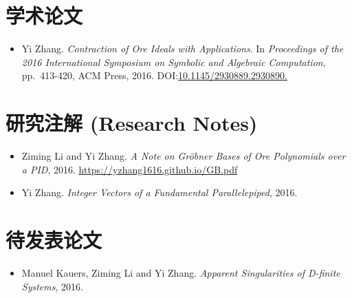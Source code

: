 \documentclass[a4paper,12pt]{article}
\begin{document}
\begin{CJK*}{UTF8}{gbsn}
\section*{\Large{学术论文}}
\begin{itemize}
 \item Yi Zhang. {\em Contraction of Ore Ideals with Applications}. 
       In {\em Proceedings of the 2016 International Symposium on Symbolic and Algebraic Computation}, 
       pp.\ 413-420, ACM Press, 2016. DOI:\href{http://dl.acm.org/citation.cfm?id=2930890}{10.1145/2930889.2930890.}
\end{itemize}

\section*{\Large{研究注解 (Research Notes)}}
\begin{itemize}
 \item Ziming Li and Yi Zhang. {\em A Note on Gr\"{o}bner Bases of Ore Polynomials over a PID}, 2016. 
 \url{https://yzhang1616.github.io/GB.pdf} 
 \item Yi Zhang. {\em Integer Vectors of a Fundamental Parallelepiped}, 2016.
\end{itemize}

\section*{\Large{待发表论文}}
\begin{itemize}
 \item Manuel Kauers, Ziming Li and Yi Zhang. {\em Apparent Singularities of D-finite Systems}, 2016. 
\end{itemize}


\end{CJK*}
\end{document}
